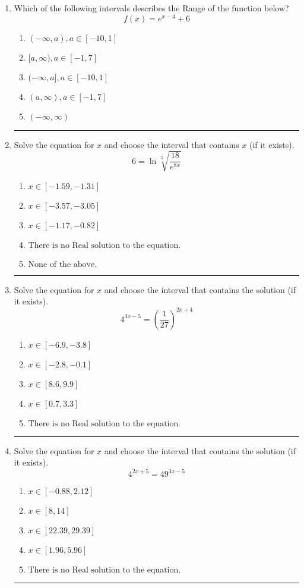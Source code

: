 \documentclass[14pt]{extbook}
\newcommand{\litem}[1]{\item#1\hspace*{-1cm}\rule{\textwidth}{0.4pt}}
\begin{document}
\begin{enumerate}
\litem{
Which of the following intervals describes the Range of the function below?\[ f(x) = e^{x-4}+6 \]\begin{enumerate}[label=\Alph*.]
\item \( (-\infty, a), a \in [-10, 1] \)
\item \( [a, \infty), a \in [-1, 7] \)
\item \( (-\infty, a], a \in [-10, 1] \)
\item \( (a, \infty), a \in [-1, 7] \)
\item \( (-\infty, \infty) \)

\end{enumerate} }
\litem{
 Solve the equation for $x$ and choose the interval that contains $x$ (if it exists).\[  6 = \ln{\sqrt[5]{\frac{18}{e^{8x}}}} \]\begin{enumerate}[label=\Alph*.]
\item \( x \in [-1.59, -1.31] \)
\item \( x \in [-3.57, -3.05] \)
\item \( x \in [-1.17, -0.82] \)
\item \( \text{There is no Real solution to the equation.} \)
\item \( \text{None of the above.} \)

\end{enumerate} }
\litem{
Solve the equation for $x$ and choose the interval that contains the solution (if it exists).\[ 4^{3x-5} = \left(\frac{1}{27}\right)^{2x+4} \]\begin{enumerate}[label=\Alph*.]
\item \( x \in [-6.9, -3.8] \)
\item \( x \in [-2.8, -0.1] \)
\item \( x \in [8.6, 9.9] \)
\item \( x \in [0.7, 3.3] \)
\item \( \text{There is no Real solution to the equation.} \)

\end{enumerate} }
\litem{
Solve the equation for $x$ and choose the interval that contains the solution (if it exists).\[ 4^{2x+5} = 49^{3x-5} \]\begin{enumerate}[label=\Alph*.]
\item \( x \in [-0.88, 2.12] \)
\item \( x \in [8, 14] \)
\item \( x \in [22.39, 29.39] \)
\item \( x \in [1.96, 5.96] \)
\item \( \text{There is no Real solution to the equation.} \)


\end{enumerate}}
\end{enumerate}
\end{document}
